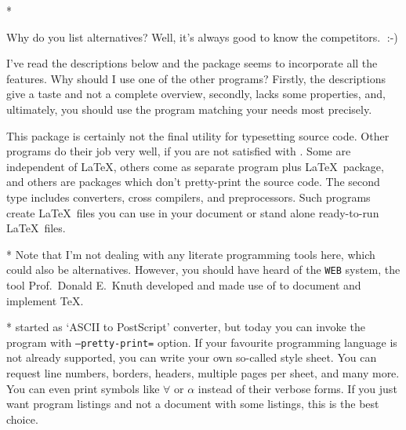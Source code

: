 \begin{paracol}{2}
\switchcolumn[0]*%
\begin{advise}
\item Why do you list alternatives?
      \advisespace
      Well, it's always good to know the competitors.^^A :-)
\item I've read the descriptions below and the  package
      seems to incorporate all the features. Why should I use one of the
      other programs?
      \advisespace
      Firstly, the descriptions give a taste and not a complete overview,
      secondly,  lacks some properties, and, ultimately,
      you should use the program matching your needs most precisely.
\end{advise}
This package is certainly not the final utility for typesetting source code.
Other programs do their job very well, if you are not satisfied with
. Some are independent of \LaTeX, others come as
separate program plus \LaTeX\ package, and others are packages which
don't pretty-print the source code. The second type includes converters,
cross compilers, and preprocessors. Such programs create \LaTeX\ files
you can use in your document or stand alone ready-to-run \LaTeX\ files.
\switchcolumn

\switchcolumn[0]*%
Note that I'm not dealing with any literate programming tools here, which
could also be alternatives. However, you should have heard of the
\texttt{WEB} system, the tool Prof.~Donald E.~Knuth developed and made use
of to document and implement \TeX.
\switchcolumn

\switchcolumn[0]*%
\textbf{\href{http://www.infres.enst.fr/~demaille/a2ps}{}}
started as `ASCII to PostScript' converter, but today you can invoke the
program with \texttt{--pretty-print=} option. If your
favourite programming language is not already supported, you can write your
own so-called style sheet. You can request line numbers, borders, headers,
multiple pages per sheet, and many more. You can even print symbols like
$\forall$ or $\alpha$ instead of their verbose forms. If you just want
program listings and not a document with some listings, this is the best
choice.
\switchcolumn


\end{paracol}
